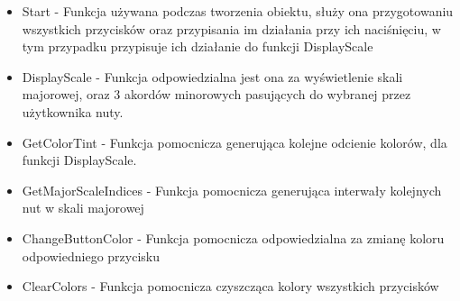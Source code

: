 \begin{itemize}
\item Start - Funkcja używana podczas tworzenia obiektu, służy ona przygotowaniu wszystkich przycisków oraz przypisania im działania przy ich naciśnięciu, w tym przypadku przypisuje ich działanie do funkcji DisplayScale
\item DisplayScale - Funkcja odpowiedzialna jest ona za wyświetlenie skali majorowej, oraz 3 akordów minorowych pasujących do wybranej przez użytkownika nuty. 
\item GetColorTint - Funkcja pomocnicza generująca kolejne odcienie kolorów, dla funkcji DisplayScale. 
\item GetMajorScaleIndices - Funkcja pomocnicza generująca interwały kolejnych nut w skali majorowej
\item ChangeButtonColor - Funkcja pomocnicza odpowiedzialna za zmianę koloru odpowiedniego przycisku
\item ClearColors - Funkcja pomocnicza czyszcząca kolory wszystkich przycisków
\end{itemize}

